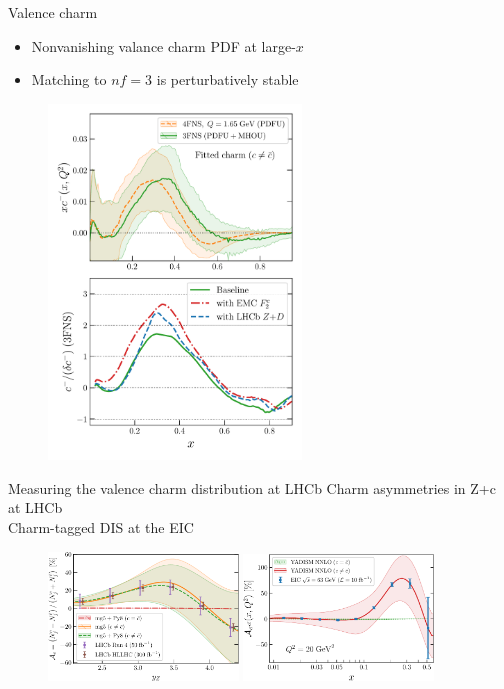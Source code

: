 \documentclass[aspectratio=43, 8pt,t]{beamer}
\begin{document}
\begin{frame}{Valence charm}
  \begin{itemize}
    \item Nonvanishing valance charm PDF at large-$x$
    \item Matching to $nf=3$ is perturbatively stable
  \end{itemize}
  \begin{figure}
    \includegraphics[width=0.6\textwidth]{CharmAsymmetryMain-3FNS-Fig2Main.pdf}
  \end{figure}
\end{frame}


\begin{frame}{Measuring the valence charm distribution at LHCb}
  Charm asymmetries in Z+c at LHCb \\
  Charm-tagged DIS at the EIC
  \begin{figure}
    \includegraphics[width=0.45\textwidth]{lhcb-zcharm-pheno-asymm.pdf}
    \includegraphics[width=0.45\textwidth]{ICasym-main-Fig4-EIC.pdf}
  \end{figure}
\end{frame}
\end{document}

